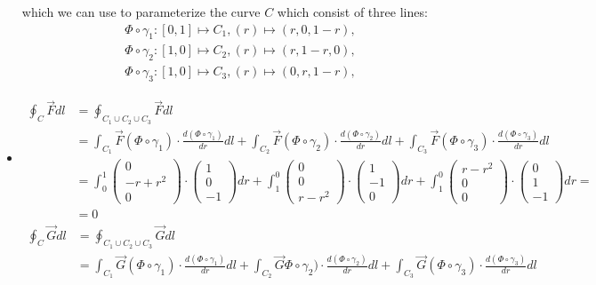 \documentclass[11pt]{article}
\begin{document}
\begin{solution}
\begin{itemize}
	which we can use to parameterize the curve $C$ which consist of three lines:
	\begin{align*}
	&\Phi\circ\gamma_1 : [0,1]\mapsto C_1, (r) \mapsto (r,0,1-r),\\
	&\Phi\circ\gamma_2 : [1,0]\mapsto C_2, (r) \mapsto (r,1-r,0),\\
	&\Phi\circ\gamma_3 : [1,0]\mapsto C_3, (r) \mapsto (0,r,1-r),
	\end{align*}
     \item 
	\begin{align*}
	\oint_C \vec F dl &= \oint_{C_1 \cup C_2 \cup C_3} \vec F dl\\
	&= \int_{C_1} \vec F(\Phi\circ \gamma_1) \cdot \frac{d(\Phi\circ \gamma_1)}{dr}dl + \int_{C_2} \vec F(\Phi\circ \gamma_2) \cdot \frac{d(\Phi\circ \gamma_2)}{dr}dl + \int_{C_3} \vec F(\Phi\circ \gamma_3) \cdot \frac{d(\Phi\circ \gamma_3)}{dr}dl\\
	&= \int_0^1 \begin{pmatrix}0\\-r+r^2\\0\end{pmatrix}\cdot\begin{pmatrix}1\\0\\-1\end{pmatrix}dr + \int_1^0 \begin{pmatrix}0\\0\\r-r^2\end{pmatrix}\cdot\begin{pmatrix}1\\-1\\0\end{pmatrix}dr + \int_1^0 \begin{pmatrix}r-r^2\\0\\0\end{pmatrix}\cdot\begin{pmatrix}0\\1\\-1\end{pmatrix}dr =\\
	&=0
	\end{align*}
	\begin{align*}
	\oint_C \vec G dl &= \oint_{C_1 \cup C_2 \cup C_3} \vec G dl\\
	&= \int_{C_1} \vec G(\Phi\circ \gamma_1) \cdot \frac{d(\Phi\circ \gamma_1)}{dr}dl + \int_{C_2} \vec G\Phi\circ \gamma_2) \cdot \frac{d(\Phi\circ \gamma_2)}{dr}dl + \int_{C_3} \vec G(\Phi\circ \gamma_3) \cdot \frac{d(\Phi\circ \gamma_3)}{dr}dl\\

\end{align*}
\end{itemize}
\end{solution}
\end{document}
